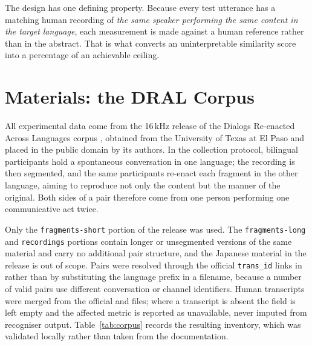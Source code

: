 The design has one defining property. Because every test utterance has a matching human recording
of \emph{the same speaker performing the same content in the target language}, each measurement is
made against a human reference rather than in the abstract. That is what converts an uninterpretable
similarity score into a percentage of an achievable ceiling.

\section{Materials: the DRAL Corpus}
\label{sec:corpus}

All experimental data come from the 16\,kHz release of the Dialogs Re-enacted Across Languages
corpus \cite{ward2023dral}, obtained from the University of Texas at El Paso and placed in the
public domain by its authors. In the collection protocol, bilingual participants hold a
spontaneous conversation in one language; the recording is then segmented, and the same
participants re-enact each fragment in the other language, aiming to reproduce not only the content
but the manner of the original. Both sides of a pair therefore come from one person performing one
communicative act twice.

Only the \texttt{fragments-short} portion of the release was used. The \texttt{fragments-long} and
\texttt{recordings} portions contain longer or unsegmented versions of the same material and carry
no additional pair structure, and the Japanese material in the release is out of scope. Pairs were
resolved through the official \texttt{trans\_id} links in
 rather than by substituting the language prefix in a filename,
because a number of valid pairs use different conversation or channel identifiers. Human
transcripts were merged from the official  and
 files; where a transcript is absent the field is left empty and the
affected metric is reported as unavailable, never imputed from recogniser output.
Table~\ref{tab:corpus} records the resulting inventory, which was validated locally rather than
taken from the documentation.

